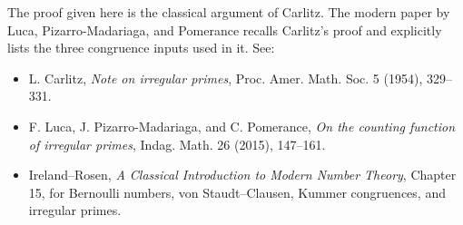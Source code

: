 \documentclass[11pt]{article}
\begin{document}
The proof given here is the classical argument of Carlitz.  The modern paper by Luca, Pizarro-Madariaga, and Pomerance recalls Carlitz's proof and explicitly lists the three congruence inputs used in it.  See:
\begin{itemize}
  \item L. Carlitz, \emph{Note on irregular primes}, Proc. Amer. Math. Soc. 5 (1954), 329--331.
  \item F. Luca, J. Pizarro-Madariaga, and C. Pomerance, \emph{On the counting function of irregular primes}, Indag. Math. 26 (2015), 147--161.
  \item Ireland--Rosen, \emph{A Classical Introduction to Modern Number Theory}, Chapter 15, for Bernoulli numbers, von Staudt--Clausen, Kummer congruences, and irregular primes.
\end{itemize}
\end{document}
